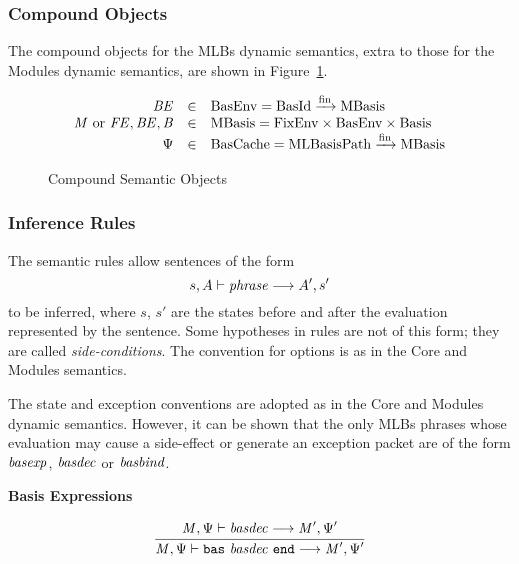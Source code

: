 \subsubsection{Compound Objects}
The compound objects for the MLBs dynamic semantics, extra to those
for the Modules dynamic semantics, are shown in Figure~\ref{fig:mlb:DS:CompoundObjects}.
\begin{figure}[h]
\begin{displaymath}
\begin{array}{rcl}
\mit{BE} & \in & \mrm{BasEnv} = \mrm{BasId} \xrightarrow{\mrm{fin}} \mrm{MBasis} \\
\mit{M} ~\mrm{or}~ \mit{FE},\mit{BE},\mit{B} & \in & \mrm{MBasis} =
\mrm{FixEnv} \times \mrm{BasEnv} \times \mrm{Basis} \\
\Psi & \in & \mrm{BasCache} = \mrm{MLBasisPath} \xrightarrow{\mrm{fin}} \mrm{MBasis} 
\end{array}
\end{displaymath}
\caption{Compound Semantic Objects}\label{fig:mlb:DS:CompoundObjects}
\end{figure}
%
\subsubsection{Inference Rules}
The semantic rules allow sentences of the form
\begin{displaymath}
s, A \vdash \mit{phrase} \longrightarrow A', s'
\end{displaymath}
to be inferred, where $s$, $s'$ are the states before and after the
evaluation represented by the sentence.  Some hypotheses in rules are
not of this form; they are called \emph{side-conditions}. The
convention for options is as in the Core and Modules semantics.

The state and exception conventions are adopted as in the Core and
Modules dynamic semantics.  However, it can be shown that the only
MLBs phrases whose evaluation may cause a side-effect or generate an
exception packet are of the form $\mit{basexp}$, $\mit{basdec}$ or
$\mit{basbind}$.

\vspace{2\parsep}
{\large\noindent
\textbf{Basis Expressions} \hfill 
{}
}\nopagebreak

\begin{equation}
\judge{
\mit{M}, \Psi \vdash \mit{basdec} \longrightarrow \mit{M}', \Psi'
}{
\mit{M}, \Psi \vdash \mtt{bas}~ \mit{basdec} ~\mtt{end} \longrightarrow \mit{M}', \Psi'
}
\end{equation}


